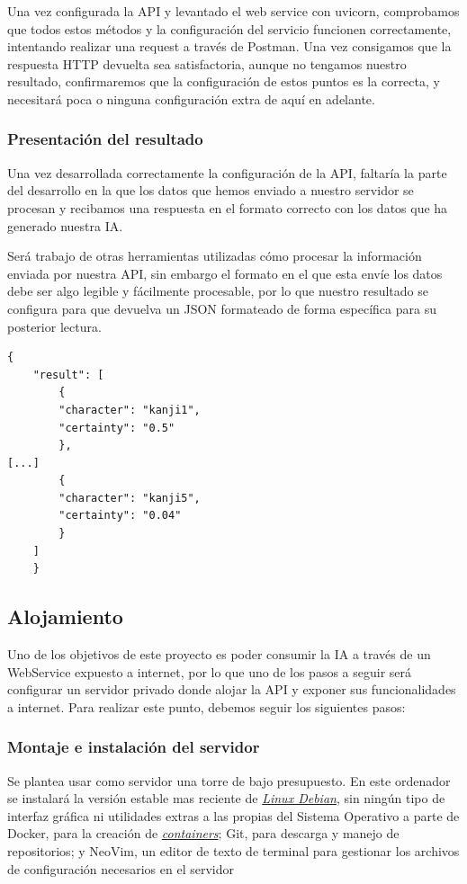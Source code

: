 \documentclass{article}
\begin{document}
Una vez configurada la API y levantado el web service con uvicorn, comprobamos que todos estos métodos y la configuración del servicio funcionen correctamente, intentando realizar una request a través de Postman. Una vez consigamos que la respuesta HTTP devuelta sea satisfactoria, aunque no tengamos nuestro resultado, confirmaremos que la configuración de estos puntos es la correcta, y necesitará poca o ninguna configuración extra de aquí en adelante.

\subsubsection{Presentación del resultado}
Una vez desarrollada correctamente la configuración de la API, faltaría la parte del desarrollo en la que los datos que hemos enviado a nuestro servidor se procesan y recibamos una respuesta en el formato correcto con los datos que ha generado nuestra IA.

Será trabajo de otras herramientas utilizadas cómo procesar la información enviada por nuestra API, sin embargo el formato en el que esta envíe los datos debe ser algo legible y fácilmente procesable, por lo que nuestro resultado se configura para que devuelva un JSON formateado de forma específica para su posterior lectura.

\noindent\begin{minipage}{\textwidth}
\begin{lstlisting}[title=Formato del JSON de respuesta., numbers=none]
	{
  	"result": [
    	{
    	"character": "kanji1",
    	"certainty": "0.5"
    	},
[...]
    	{
    	"character": "kanji5",
    	"certainty": "0.04"
    	}
  	]
	}
\end{lstlisting}
\end{minipage}

\subsection{Alojamiento}
Uno de los objetivos de este proyecto es poder consumir la IA a través de un WebService expuesto a internet, por lo que uno de los pasos a seguir será configurar un servidor privado donde alojar la API y exponer sus funcionalidades a internet. Para realizar este punto, debemos seguir los siguientes pasos:

\subsubsection{Montaje e instalación del servidor}
Se plantea usar como servidor una torre de bajo presupuesto. En este ordenador se instalará la versión estable mas reciente de \hyperref[sec:terms]{\textit{Linux Debian}\tec}, sin ningún tipo de interfaz gráfica ni utilidades extras a las propias del Sistema Operativo a parte de Docker, para la creación de \hyperref[sec:terms]{\textit{containers}\tec}; Git, para descarga y manejo de repositorios; y NeoVim, un editor de texto de terminal para gestionar los archivos de configuración necesarios en el servidor
\end{document}
